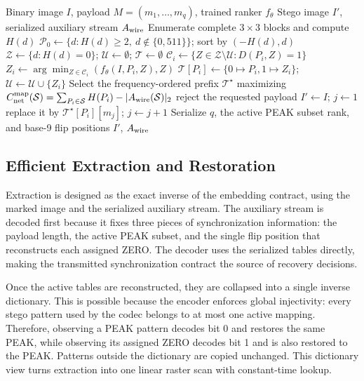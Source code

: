 \documentclass[a4paper,fleqn]{cas-dc}
\newcommand{\RevisionAddBegin}{\begingroup}
\newcommand{\RevisionAddEnd}{\endgroup}
\newcommand{\RevisionAddBegin}{\begingroup\color{revisionblue}}
\newcommand{\RevisionAddEnd}{\endgroup}
\begin{document}
\begin{algorithm*}[t]
\caption{Net-Aware CNN-Ranked Distance-One Embedding}
\label{alg:embedding}
\begin{algorithmic}[1]
\Require Binary image $I$, payload $M=(m_1,\ldots,m_q)$, trained ranker $f_\theta$
\Ensure Stego image $I'$, serialized auxiliary stream $A_{\rm wire}$
\State Enumerate complete $3\times3$ blocks and compute $H(d)$
\State $\mathcal P_0\gets\{d:H(d)\ge2,\ d\notin\{0,511\}\}$; sort by $(-H(d),d)$
\State $\mathcal Z\gets\{d:H(d)=0\}$; $\mathcal U\gets\emptyset$; $\mathcal T\gets\emptyset$
    \State $\mathcal C_i\gets\{Z\in\mathcal Z\setminus\mathcal U:D(P_i,Z)=1\}$
        \State $Z_i\gets\arg\min_{Z\in\mathcal C_i}(f_\theta(I,P_i,Z),Z)$
        \State $\mathcal T[P_i]\gets\{0\mapsto P_i,1\mapsto Z_i\}$;
        $\mathcal U\gets\mathcal U\cup\{Z_i\}$
    \EndIf
\EndFor
\State Select the frequency-ordered prefix $\mathcal T^\star$ maximizing
\RevisionAddBegin
$C_{\rm net}^{\rm map}(\mathcal S)=
\sum_{P_i\in\mathcal S}H(P_i)-|A_{\rm wire}(\mathcal S)|_2$
\RevisionAddEnd
{}
    \State reject the requested payload
\EndIf
\State $I'\gets I$; $j\gets1$
        \State replace it by $\mathcal T^\star[P_i][m_j]$; $j\gets j+1$
    \EndIf
\EndFor
\State Serialize $q$, the active PEAK subset rank, and base-9 flip positions
\State \Return $I'$, $A_{\rm wire}$
\end{algorithmic}
\end{algorithm*}

\subsection{Efficient Extraction and Restoration}
\RevisionAddBegin
Extraction is designed as the exact inverse of the embedding contract, using
the marked image and the serialized auxiliary stream. The auxiliary stream
is decoded first because it fixes three pieces of synchronization information:
the payload length, the active PEAK subset, and the single flip position that
reconstructs each assigned ZERO. The decoder uses the serialized tables
directly, making the transmitted synchronization contract the source of
recovery decisions.

Once the active tables are reconstructed, they are collapsed into a single
inverse dictionary. This is possible because the encoder enforces global
injectivity: every stego pattern used by the codec belongs to at most one active
mapping. Therefore, observing a PEAK pattern decodes bit 0 and restores the same
PEAK, while observing its assigned ZERO decodes bit 1 and is also restored to
the PEAK. Patterns outside the dictionary are copied unchanged. This dictionary
view turns extraction into one linear raster scan with constant-time lookup.
\end{document}
